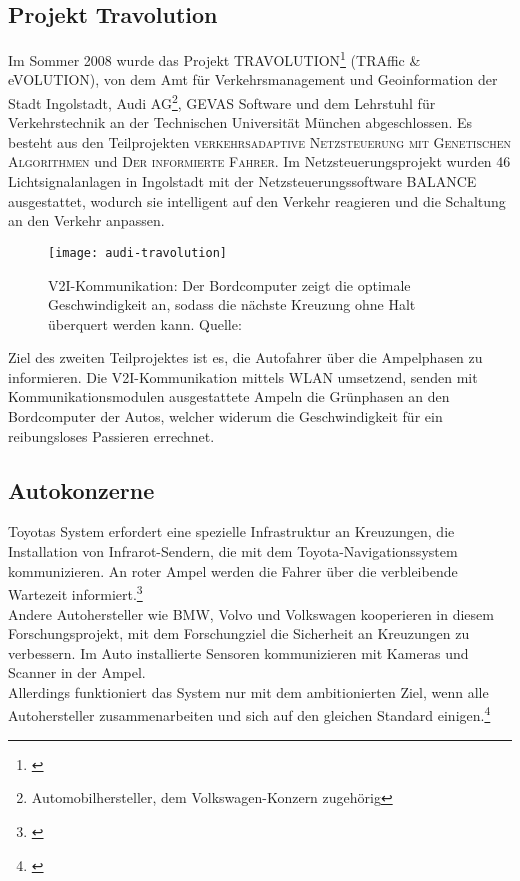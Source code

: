\subsection{Projekt Travolution}
Im Sommer 2008 wurde das Projekt TRAVOLUTION\footnote{\cite{Travolution}} (TRAffic \& eVOLUTION), von dem Amt für Verkehrsmanagement und Geoinformation der Stadt Ingolstadt, Audi AG\footnote{Automobilhersteller, dem Volkswagen-Konzern zugehörig}, GEVAS Software und dem Lehrstuhl für Verkehrstechnik an der Technischen Universität München abgeschlossen. Es besteht aus den Teilprojekten \textsc{verkehrsadaptive Netzsteuerung mit Genetischen Algorithmen} und \textsc{Der informierte Fahrer}. Im Netzsteuerungsprojekt wurden 46 Lichtsignalanlagen in Ingolstadt mit der Netzsteuerungssoftware BALANCE ausgestattet, wodurch sie intelligent auf den Verkehr reagieren und die Schaltung an den Verkehr anpassen. 
\begin{figure}[H]  
    \centering  
    \texttt{[image: audi-travolution]}
    \label{fig:travolution}
    \caption[Projekt Travolution]{\gls{V2I}-Kommunikation: Der Bordcomputer zeigt die optimale Geschwindigkeit an, sodass die nächste Kreuzung ohne Halt überquert werden kann. Quelle: \cite{AudiTravolution}}
\end{figure}
Ziel des zweiten Teilprojektes ist es, die Autofahrer über die Ampelphasen zu informieren. Die \gls{V2I}-Kommunikation mittels WLAN umsetzend, senden mit Kommunikationsmodulen ausgestattete Ampeln die Grünphasen an den Bordcomputer der Autos, welcher widerum die Geschwindigkeit für ein reibungsloses Passieren errechnet.
\subsection{Autokonzerne}
Toyotas System erfordert eine spezielle Infrastruktur an Kreuzungen, die Installation von Infrarot-Sendern, die mit dem Toyota-Navigationssystem kommunizieren. An roter Ampel werden die Fahrer über die verbleibende Wartezeit informiert.\footnote{\cite{Toyota}}\\
Andere Autohersteller wie BMW, Volvo und Volkswagen kooperieren in diesem Forschungsprojekt, mit dem Forschungziel die Sicherheit an Kreuzungen zu verbessern. Im Auto installierte Sensoren kommunizieren mit Kameras und Scanner in der Ampel. \\
Allerdings funktioniert das System nur mit dem ambitionierten Ziel, wenn alle Autohersteller zusammenarbeiten und sich auf den gleichen Standard einigen.\footnote{\cite{Siemens}}
